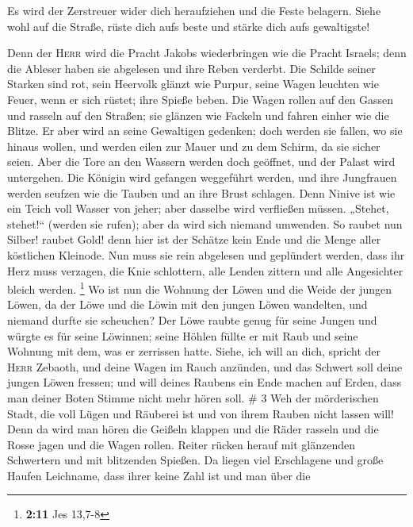  Es wird der Zerstreuer wider dich heraufziehen und die
Feste belagern. Siehe wohl auf die Straße, rüste dich aufs beste und
stärke dich aufs gewaltigste!

 Denn der \textsc{Herr} wird die Pracht Jakobs
wiederbringen wie die Pracht Israels; denn die Ableser haben sie
abgelesen und ihre Reben verderbt.  Die Schilde seiner
Starken sind rot, sein Heervolk glänzt wie Purpur, seine Wagen leuchten
wie Feuer, wenn er sich rüstet; ihre Spieße beben.  Die
Wagen rollen auf den Gassen und rasseln auf den Straßen; sie glänzen wie
Fackeln und fahren einher wie die Blitze.  Er aber wird an
seine Gewaltigen gedenken; doch werden sie fallen, wo sie hinaus wollen,
und werden eilen zur Mauer und zu dem Schirm, da sie sicher seien.
 Aber die Tore an den Wassern werden doch geöffnet, und
der Palast wird untergehen.  Die Königin wird gefangen
weggeführt werden, und ihre Jungfrauen werden seufzen wie die Tauben und
an ihre Brust schlagen.  Denn Ninive ist wie ein Teich
voll Wasser von jeher; aber dasselbe wird verfließen müssen. „Stehet,
stehet!{}`` (werden sie rufen); aber da wird sich niemand umwenden.
 So raubet nun Silber! raubet Gold! denn hier ist der
Schätze kein Ende und die Menge aller köstlichen Kleinode.
 Nun muss sie rein abgelesen und geplündert werden, dass
ihr Herz muss verzagen, die Knie schlottern, alle Lenden zittern und
alle Angesichter bleich werden. \footnote{\textbf{2:11} Jes 13,7-8}
 Wo ist nun die Wohnung der Löwen und die Weide der
jungen Löwen, da der Löwe und die Löwin mit den jungen Löwen wandelten,
und niemand durfte sie scheuchen?  Der Löwe raubte genug
für seine Jungen und würgte es für seine Löwinnen; seine Höhlen füllte
er mit Raub und seine Wohnung mit dem, was er zerrissen hatte.
 Siehe, ich will an dich, spricht der \textsc{Herr}
Zebaoth, und deine Wagen im Rauch anzünden, und das Schwert soll deine
jungen Löwen fressen; und will deines Raubens ein Ende machen auf Erden,
dass man deiner Boten Stimme nicht mehr hören soll. \# 3 
Weh der mörderischen Stadt, die voll Lügen und Räuberei ist und von
ihrem Rauben nicht lassen will!  Denn da wird man hören
die Geißeln klappen und die Räder rasseln und die Rosse jagen und die
Wagen rollen.  Reiter rücken herauf mit glänzenden
Schwertern und mit blitzenden Spießen. Da liegen viel Erschlagene und
große Haufen Leichname, dass ihrer keine Zahl ist und man über die
